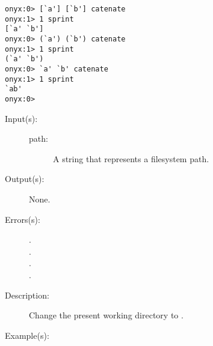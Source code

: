 \begin{description}
\begin{description}
\begin{verbatim}
onyx:0> [`a'] [`b'] catenate
onyx:1> 1 sprint
[`a' `b']
onyx:0> (`a') (`b') catenate
onyx:1> 1 sprint
(`a' `b')
onyx:0> `a' `b' catenate
onyx:1> 1 sprint
`ab'
onyx:0>
		\end{verbatim}
	\end{description}
\label{systemdict:cd}
\item[{\onyxop{path}{cd}{--}}: ]
	\begin{description}\item[]
	\item[Input(s): ]
		\begin{description}\item[]
		\item[path: ]
			A string that represents a filesystem path.
		\end{description}
	\item[Output(s): ] None.
	\item[Errors(s): ]
		\begin{description}\item[]
		\item[.]
		\item[.]
		\item[.]
		\item[.]
		\end{description}
	\item[Description: ]
		Change the present working directory to .
	\item[Example(s): ]\begin{verbatim}


\end{verbatim}
\end{description}
\end{description}
